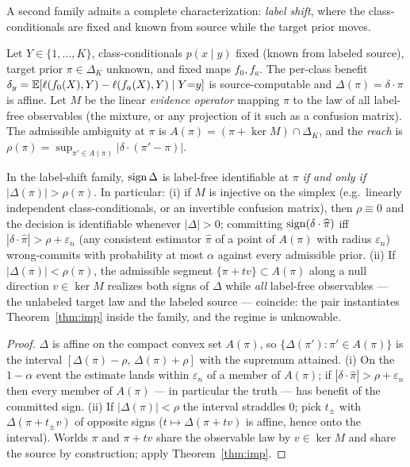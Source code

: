 
A second family admits a complete characterization: \emph{label shift}, where the
class-conditionals are fixed and known from source while the target prior moves.

\begin{definition}\label{def:lsreach}
Let $Y\in\{1,\dots,K\}$, class-conditionals $p(x\mid y)$ fixed (known from labeled
source), target prior $\pi\in\Delta_K$ unknown, and fixed maps $f_0,f_a$. The per-class
benefit $\delta_y=\mathbb{E}[\ell(f_0(X),Y)-\ell(f_a(X),Y)\mid Y{=}y]$ is source-computable and
$\Delta(\pi)=\delta\cdot\pi$ is affine. Let $M$ be the linear \emph{evidence operator}
mapping $\pi$ to the law of all label-free observables (the mixture, or any projection
of it such as a confusion matrix). The admissible ambiguity at $\pi$ is
$A(\pi)=(\pi+\ker M)\cap\Delta_K$, and the \emph{reach} is
$\rho(\pi)=\sup_{\pi'\in A(\pi)}|\delta\cdot(\pi'-\pi)|$.
\end{definition}

\begin{proposition}\label{thm:ls-iff}
In the label-shift family, $\operatorname{sign}\Delta$ is label-free identifiable at $\pi$ \emph{if
and only if} $|\Delta(\pi)|>\rho(\pi)$. In particular:
\textup{(i)} if $M$ is injective on the simplex (e.g.\ linearly independent
class-conditionals, or an invertible confusion matrix), then $\rho\equiv0$ and the
decision is identifiable whenever $|\Delta|>0$; committing
$\operatorname{sign}(\delta\cdot\widehat\pi)$ iff $|\delta\cdot\widehat\pi|>\rho+\varepsilon_n$ (any
consistent estimator $\widehat\pi$ of a point of $A(\pi)$ with radius $\varepsilon_n$)
wrong-commits with probability at most $\alpha$ against every admissible prior.
\textup{(ii)} If $|\Delta(\pi)|<\rho(\pi)$, the admissible segment
$\{\pi+tv\}\subset A(\pi)$ along a null direction $v\in\ker M$ realizes both signs of
$\Delta$ while \emph{all} label-free observables --- the unlabeled target law and the
labeled source --- coincide: the pair instantiates Theorem~\ref{thm:imp} inside the
family, and the regime is unknowable.
\end{proposition}
\begin{proof}
$\Delta$ is affine on the compact convex set $A(\pi)$, so
$\{\Delta(\pi'):\pi'\in A(\pi)\}$ is the interval
$[\Delta(\pi)-\rho,\,\Delta(\pi)+\rho]$ with the supremum attained.
(i) On the $1-\alpha$ event the estimate lands within $\varepsilon_n$ of a member of
$A(\pi)$; if $|\delta\cdot\widehat\pi|>\rho+\varepsilon_n$ then every member of
$A(\pi)$ --- in particular the truth --- has benefit of the committed sign.
(ii) If $|\Delta(\pi)|<\rho$ the interval straddles $0$; pick
$t_\pm$ with $\Delta(\pi+t_\pm v)$ of opposite signs ($t\mapsto\Delta(\pi+tv)$ is
affine, hence onto the interval). Worlds $\pi$ and $\pi+tv$ share the observable law by
$v\in\ker M$ and share the source by construction; apply Theorem~\ref{thm:imp}.
\end{proof}

